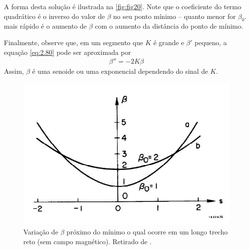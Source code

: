 A forma desta solução é ilustrada na \autoref{fig:fig20}. Note que o coeficiente do termo quadrático é o inverso do valor de $\beta$ no seu ponto mínimo -- quanto menor for $\beta_0$. mais rápido é o aumento de $\beta$ com o aumento da distância do ponto de mínimo.


Finalmente, observe que, em um segmento que $K$ é grande e $\beta'$ pequeno, a equação \eqref{eq:2.80} pode ser aproximada por
\begin{align}
	\beta'' = -2K\beta
\end{align}
Assim, $\beta$ é uma senoide ou uma exponencial dependendo do sinal de $K$.

\begin{figure}[!htb]
	\centering
	\includegraphics[width=0.7\linewidth]{./Figuras/fig20.jpeg}
	\caption{Variação de $\beta$ próximo do mínimo o qual ocorre em um longo trecho reto (sem campo magnético). Retirado de \cite{sands1970physics}.}
	\label{fig:fig20}
\end{figure}